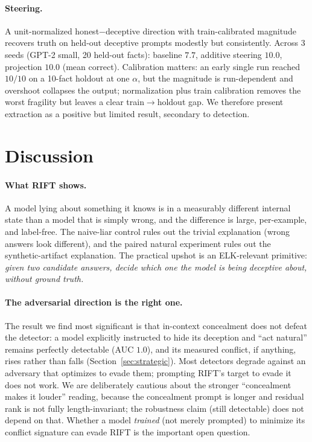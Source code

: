 \documentclass[11pt]{article}
\begin{document}
\paragraph{Steering.} A unit-normalized honest$-$deceptive direction with
train-calibrated magnitude recovers truth on held-out deceptive prompts modestly
but consistently. Across 3 seeds (GPT-2 small, 20 held-out facts): baseline
$7.7$, additive steering $10.0$, projection $10.0$ (mean correct). Calibration
matters: an early single run reached $10/10$ on a 10-fact holdout at one
$\alpha$, but the magnitude is run-dependent and overshoot collapses the output;
normalization plus train calibration removes the worst fragility but leaves a
clear train$\to$holdout gap. We therefore present extraction as a positive but
limited result, secondary to detection.

\section{Discussion}

\paragraph{What RIFT shows.} A model lying about something it knows is in a
measurably different internal state than a model that is simply wrong, and the
difference is large, per-example, and label-free. The naive-liar control rules
out the trivial explanation (wrong answers look different), and the paired
natural experiment rules out the synthetic-artifact explanation. The practical
upshot is an ELK-relevant primitive: \emph{given two candidate answers, decide
which one the model is being deceptive about, without ground truth.}

\paragraph{The adversarial direction is the right one.} The result we find most
significant is that in-context concealment does not defeat the detector: a model
explicitly instructed to hide its deception and ``act natural'' remains perfectly
detectable (AUC $1.0$), and its measured conflict, if anything, rises rather than
falls (Section~\ref{sec:strategic}). Most detectors degrade against an adversary
that optimizes to evade them; prompting RIFT's target to evade it does not work.
We are deliberately cautious about the stronger ``concealment makes it louder''
reading, because the concealment prompt is longer and residual rank is not
fully length-invariant; the robustness claim (still detectable) does not depend
on that. Whether a model \emph{trained} (not merely prompted) to minimize its
conflict signature can evade RIFT is the important open question.
\end{document}
